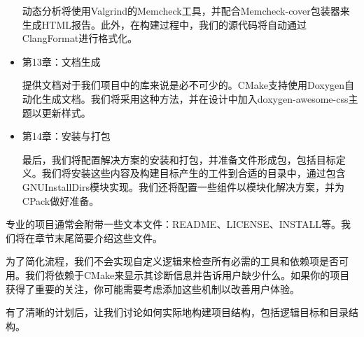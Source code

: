\begin{itemize}
动态分析将使用Valgrind的Memcheck工具，并配合Memcheck-cover包装器来生成HTML报告。此外，在构建过程中，我们的源代码将自动通过ClangFormat进行格式化。

\item
第13章：文档生成

提供文档对于我们项目中的库来说是必不可少的。CMake支持使用Doxygen自动化生成文档。我们将采用这种方法，并在设计中加入doxygen-awesome-css主题以更新样式。

\item
第14章：安装与打包

最后，我们将配置解决方案的安装和打包，并准备文件形成包，包括目标定义。我们将安装这些内容及构建目标产生的工件到合适的目录中，通过包含GNUInstallDirs模块实现。我们还将配置一些组件以模块化解决方案，并为CPack做好准备。
\end{itemize}

专业的项目通常会附带一些文本文件：README、LICENSE、INSTALL等。我们将在章节末尾简要介绍这些文件。

为了简化流程，我们不会实现自定义逻辑来检查所有必需的工具和依赖项是否可用。我们将依赖于CMake来显示其诊断信息并告诉用户缺少什么。如果你的项目获得了重要的关注，你可能需要考虑添加这些机制以改善用户体验。

有了清晰的计划后，让我们讨论如何实际地构建项目结构，包括逻辑目标和目录结构。


































